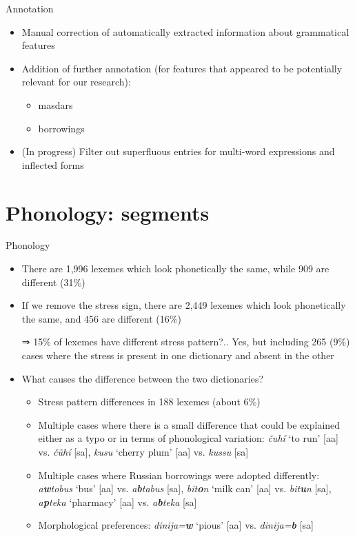 \begin{frame}{Annotation}
\begin{itemize}
    \item Manual correction of automatically extracted information about grammatical features
    \item Addition of further annotation (for features that appeared to be potentially relevant for our research):
    \begin{itemize}
        \item masdars
        \item borrowings
    \end{itemize}
    \item (In progress) Filter out superfluous entries for multi-word expressions and inflected forms
\end{itemize}
    
\end{frame}

\section{Phonology: segments}
\begin{frame}{Phonology}
\begin{itemize}
    \item There are 1,996 lexemes which look phonetically the same, while 909
are different (31\%)
    \item If we remove the stress sign, there are 2,449 lexemes which look
phonetically the same, and 456 are different (16\%)
    \item[⇒] 15\% of lexemes have different stress pattern?.. \pause Yes, but including 265 (9\%) cases where the stress is present in one dictionary and absent in the other
    \item What causes the difference between the two dictionaries?
    \begin{itemize}
        \item Stress pattern differences in 188 lexemes (about 6\%)
        \item Multiple cases where there is a small difference that could be
explained either as a typo or in terms of phonological variation: \textit{čuhí}
‘to run’ [aa] vs. \textit{čũhí} [sa], \textit{kusu} ‘cherry plum’ [aa] vs. \textit{kussu} [sa]
        \item Multiple cases where Russian borrowings were adopted differently: \textit{a\textbf{w}tobus} ‘bus’ [aa] vs. \textit{a\textbf{b}tabus} [sa], \textit{bit\textbf{o}n} ‘milk can’ [aa] vs. \textit{bit\textbf{u}n} [sa], \textit{a\textbf{p}teka} ‘pharmacy’ [aa] vs. \textit{a\textbf{b}teka} [sa]
        \item Morphological preferences: \textit{dinija=\textbf{w}} ‘pious’ [aa] vs. \textit{dinija=\textbf{b}} [sa]
    \end{itemize}

\end{itemize}    
\end{frame}

